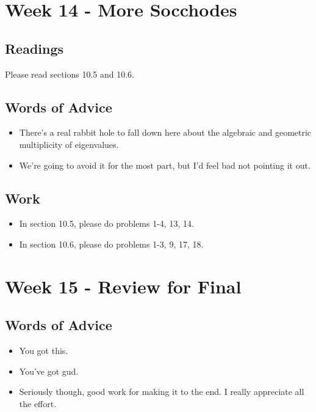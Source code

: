 	\clearpage



	\section{Week 14 - More Socchodes}

	\subsection{Readings}
		Please read sections 10.5 and 10.6.

	\subsection{Words of Advice}
		\begin{itemize}
			\item There's a real rabbit hole to fall down here about the algebraic and geometric multiplicity of eigenvalues.
			\item We're going to avoid it for the most part, but I'd feel bad not pointing it out.
		\end{itemize}

	\subsection{Work}
		\begin{itemize}
			\item In section 10.5, please do problems 1-4, 13, 14.
			\item In section 10.6, please do problems 1-3, 9, 17, 18.
		\end{itemize}

	\clearpage



	\section{Week 15 - Review for Final}

	\subsection{Words of Advice}
		\begin{itemize}
			\item You got this.
			\item You've got gud.
			\item Seriously though, good work for making it to the end. I really appreciate all the effort.
		\end{itemize}

	\clearpage



